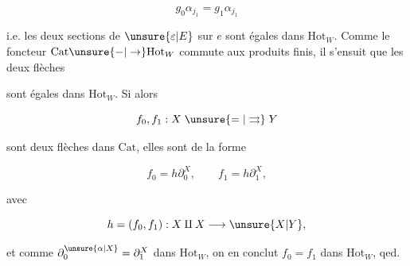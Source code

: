 
\[
 g_0\alpha_{j_1}=g_1\alpha_{j_1}
\]

i.e. les deux sections de $\unsure{\varepsilon|E}$ sur $e$ sont égales
dans $\mathrm{Hot}_{W}$. Comme le foncteur $\mathrm{Cat}\unsure{-|\to}\mathrm{Hot}_{W}$
commute aux produits finis, il s'ensuit
que  les deux flèches


sont égales dans $\mathrm{Hot}_{W}$. Si alors

\[
 f_0,f_1:X\mathrel{\unsure{=|\rightrightarrows}}Y
\]

sont deux flèches dans $\mathrm{Cat}$, elles sont de
la forme

\[
 f_0=h\partial_0^X,\qquad f_1=h\partial_1^X,
\]

avec

\[
 h=(f_0,f_1):X\amalg X\longrightarrow\unsure{X|Y},
\]

et comme $\partial_0^{\unsure{\alpha|X}}=\partial_1^X$ dans $\mathrm{Hot}_{W}$, on en
conclut $f_0=f_1$ dans $\mathrm{Hot}_{W}$, qed.
